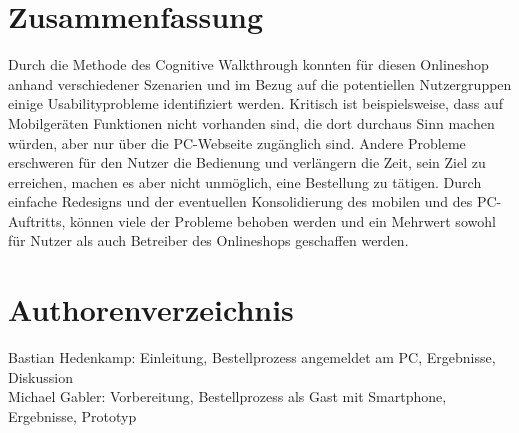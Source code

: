 \documentclass[	12pt, 
				a4paper, 
				BCOR=10mm, %
				DIV=12, 
				parskip=half, %
				headings=small, %
				twoside, %
				ngerman,
				bibliography=totoc,index=totoc, listof=totoc,
				numbers=noendperiod
				]{scrbook} %
\theoremstyle{plain}%
\theoremstyle{definition}
\theoremstyle{remark}
\begin{document}
\chapter{Zusammenfassung}
Durch die Methode des Cognitive Walkthrough konnten für diesen Onlineshop anhand verschiedener Szenarien und im Bezug auf die potentiellen Nutzergruppen einige Usabilityprobleme identifiziert werden. Kritisch ist beispielsweise, dass auf Mobilgeräten Funktionen nicht vorhanden sind, die dort durchaus Sinn machen würden, aber nur über die PC-Webseite zugänglich sind. Andere Probleme erschweren für den Nutzer die Bedienung und verlängern die Zeit, sein Ziel zu erreichen, machen es aber nicht unmöglich, eine Bestellung zu tätigen. Durch einfache Redesigns und der eventuellen Konsolidierung des mobilen und des PC-Auftritts, können viele der Probleme behoben werden und ein Mehrwert sowohl für Nutzer als auch Betreiber des Onlineshops geschaffen werden.


\newpage
 \printbibliography	%

\appendix 				%

\newpage
\chapter{Authorenverzeichnis}
Bastian Hedenkamp: Einleitung, Bestellprozess angemeldet am PC, Ergebnisse, Diskussion \\
Michael Gabler: Vorbereitung, Bestellprozess als Gast mit Smartphone, Ergebnisse, Prototyp 
\end{document}
